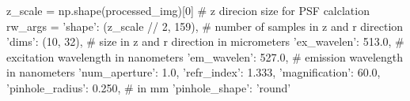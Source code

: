     		z_scale = np.shape(processed_img)[0]  # z direcion size for PSF calclation
    		rw_args = {'shape': (z_scale // 2, 159),  # number of samples in z and r direction
                       'dims': (10, 32),   # size in z and r direction in micrometers
                       'ex_wavelen': 513.0,  # excitation wavelength in nanometers
                       'em_wavelen': 527.0,  # emission wavelength in nanometers
                       'num_aperture': 1.0,
                       'refr_index': 1.333,
                       'magnification': 60.0,
                       'pinhole_radius': 0.250,  # in mm
                       'pinhole_shape': 'round'}